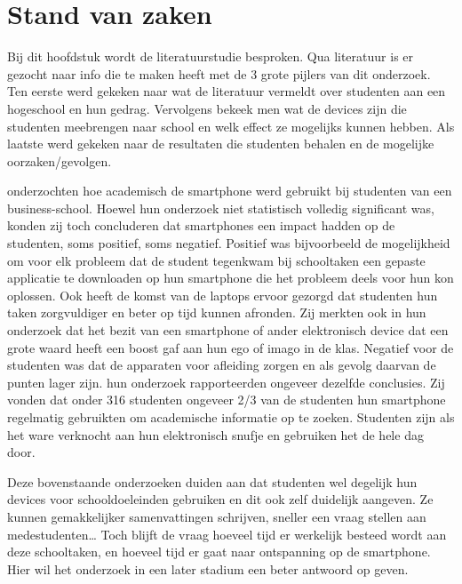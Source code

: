 \chapter{Stand van zaken}
\label{ch:stand-van-zaken}

Bij dit hoofdstuk wordt de literatuurstudie besproken. Qua literatuur is er gezocht naar info die te maken heeft met de 3 grote pijlers van dit onderzoek. Ten eerste werd gekeken naar wat de literatuur vermeldt over studenten aan een hogeschool en hun gedrag. Vervolgens bekeek men wat de devices zijn die studenten meebrengen naar school en welk effect ze mogelijks kunnen hebben. Als laatste werd gekeken naar de resultaten die studenten behalen en de mogelijke oorzaken/gevolgen.

\textcite{Johnson2017} onderzochten hoe academisch de smartphone werd gebruikt bij studenten van een business-school. Hoewel hun onderzoek niet statistisch volledig significant was, konden zij toch concluderen dat smartphones een impact hadden op de studenten, soms positief, soms negatief. Positief was bijvoorbeeld de mogelijkheid om voor elk probleem dat de student tegenkwam bij schooltaken een gepaste applicatie te downloaden op hun smartphone die het probleem deels voor hun kon oplossen. Ook heeft de komst van de laptops ervoor gezorgd dat studenten hun taken zorgvuldiger en beter op tijd kunnen afronden. Zij merkten ook in hun onderzoek dat het bezit van een smartphone of ander elektronisch device dat een grote waard heeft een boost gaf aan hun ego of imago in de klas. Negatief voor de studenten was dat de apparaten voor afleiding zorgen en als gevolg daarvan de punten lager zijn. \textcite{Hossain2016} hun onderzoek rapporteerden ongeveer dezelfde conclusies. Zij vonden dat onder 316 studenten ongeveer 2/3 van de studenten hun smartphone regelmatig gebruikten om academische informatie op te zoeken. Studenten zijn als het ware verknocht aan hun elektronisch snufje en gebruiken het de hele dag door. 

Deze bovenstaande onderzoeken duiden aan dat studenten wel degelijk hun devices voor schooldoeleinden gebruiken en dit ook zelf duidelijk aangeven. Ze kunnen gemakkelijker samenvattingen schrijven, sneller een vraag stellen aan medestudenten… Toch blijft de vraag hoeveel tijd er werkelijk besteed wordt aan deze schooltaken, en hoeveel tijd er gaat naar ontspanning op de smartphone. Hier wil het onderzoek in een later stadium een beter antwoord op geven.

